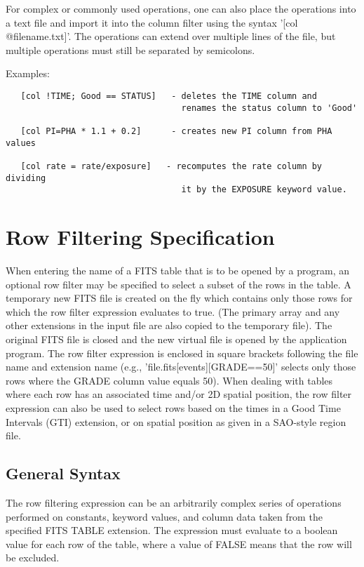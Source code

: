 \documentclass[11pt]{book}
\begin{document}
For  complex  or commonly used operations,  one  can also  place the
operations into a text  file and  import it  into the  column filter
using  the syntax '[col @filename.txt]'.   The operations can extend
over multiple lines of the  file, but multiple operations must still
be separated by semicolons.

Examples:

\begin{verbatim}
   [col !TIME; Good == STATUS]   - deletes the TIME column and
                                   renames the status column to 'Good'

   [col PI=PHA * 1.1 + 0.2]      - creates new PI column from PHA values

   [col rate = rate/exposure]   - recomputes the rate column by dividing
                                   it by the EXPOSURE keyword value.
\end{verbatim}


\section{Row Filtering Specification}

    When entering the name of a FITS table that is to be opened by a
    program, an optional row filter may be specified to select a subset
    of the rows in the table.  A temporary new FITS file is created on
    the fly which contains only those rows for which the row filter
    expression evaluates to true.  (The primary array and any other
    extensions in the input file are also copied to the temporary
    file).  The original FITS file is closed and the new virtual file
    is opened by the application program.  The row filter expression is
    enclosed in square brackets following the file name and extension
    name (e.g., 'file.fits[events][GRADE==50]'  selects only those rows
    where the GRADE column value equals 50).   When dealing with tables
    where each row has an associated time and/or 2D spatial position,
    the row filter expression can also be used to select rows based on
    the times in a Good Time Intervals (GTI) extension, or on spatial
    position as given in a SAO-style region file.


\subsection{General Syntax}

    The row filtering  expression can be an arbitrarily  complex series
    of operations performed  on constants,  keyword values,  and column
    data taken from the specified FITS TABLE extension.  The expression
    must evaluate to a boolean  value for each row  of the table, where
    a value of FALSE means that the row will be excluded.
\end{document}
